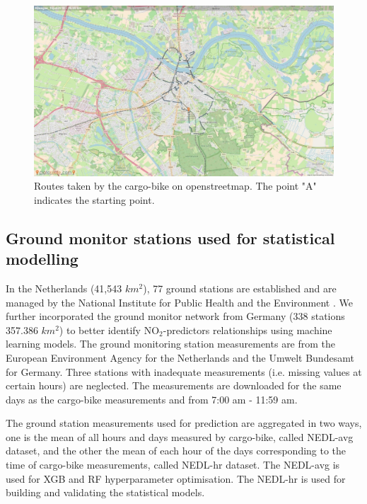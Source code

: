 \documentclass{article}
\begin{document}
\begin{figure}
    \includegraphics[width=\linewidth,trim=4cm 1cm 4cm 1cm, clip=true]{f1b.jpg}
    
    \caption {Routes taken by the cargo-bike on openstreetmap\citep{openstreetmap}. The point "A" indicates the starting point. }
    \label{route}
\end{figure}

\subsection{Ground monitor stations used for statistical modelling}

In the Netherlands (41,543 $km^2$), 77 ground stations are established and are managed by the National Institute for Public Health and the Environment \citep[RIVM,][]{RIVMLML}. We further incorporated the ground monitor network from Germany (338 stations 357.386 $km^2$) to better identify NO$_2$-predictors relationships using machine learning models. The ground monitoring station measurements 
are from the European Environment Agency \citep{EEA} for the Netherlands and the Umwelt Bundesamt \citep{germansource} for Germany. Three stations with inadequate measurements (i.e. missing values at certain hours) are neglected. The measurements are downloaded for the same days as the cargo-bike measurements and from 7:00 am - 11:59 am.  

The ground station measurements used for prediction are aggregated in two ways, one is the mean of all hours and days measured by cargo-bike, called NEDL-avg dataset, and the other the mean of each hour of the days corresponding to the time of cargo-bike measurements, called NEDL-hr dataset. The NEDL-avg is used for XGB and RF hyperparameter optimisation. The NEDL-hr is used for building and validating the statistical models.
\end{document}
